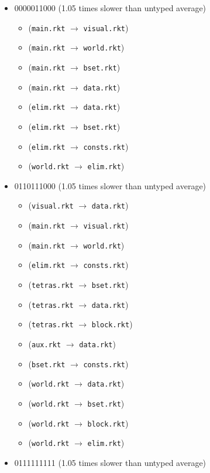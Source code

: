 \documentclass{article}
\newcommand{\mono}[1]{\texttt{#1}}
\begin{document}
\begin{itemize}
\item 0000011000 (1.05 times slower than untyped average)
  \begin{itemize}
  \item (\mono{main.rkt} $\rightarrow$ \mono{visual.rkt})
  \item (\mono{main.rkt} $\rightarrow$ \mono{world.rkt})
  \item (\mono{main.rkt} $\rightarrow$ \mono{bset.rkt})
  \item (\mono{main.rkt} $\rightarrow$ \mono{data.rkt})
  \item (\mono{elim.rkt} $\rightarrow$ \mono{data.rkt})
  \item (\mono{elim.rkt} $\rightarrow$ \mono{bset.rkt})
  \item (\mono{elim.rkt} $\rightarrow$ \mono{consts.rkt})
  \item (\mono{world.rkt} $\rightarrow$ \mono{elim.rkt})
  \end{itemize}
\item 0110111000 (1.05 times slower than untyped average)
  \begin{itemize}
  \item (\mono{visual.rkt} $\rightarrow$ \mono{data.rkt})
  \item (\mono{main.rkt} $\rightarrow$ \mono{visual.rkt})
  \item (\mono{main.rkt} $\rightarrow$ \mono{world.rkt})
  \item (\mono{elim.rkt} $\rightarrow$ \mono{consts.rkt})
  \item (\mono{tetras.rkt} $\rightarrow$ \mono{bset.rkt})
  \item (\mono{tetras.rkt} $\rightarrow$ \mono{data.rkt})
  \item (\mono{tetras.rkt} $\rightarrow$ \mono{block.rkt})
  \item (\mono{aux.rkt} $\rightarrow$ \mono{data.rkt})
  \item (\mono{bset.rkt} $\rightarrow$ \mono{consts.rkt})
  \item (\mono{world.rkt} $\rightarrow$ \mono{data.rkt})
  \item (\mono{world.rkt} $\rightarrow$ \mono{bset.rkt})
  \item (\mono{world.rkt} $\rightarrow$ \mono{block.rkt})
  \item (\mono{world.rkt} $\rightarrow$ \mono{elim.rkt})
  \end{itemize}
\item 0111111111 (1.05 times slower than untyped average)
  \begin{itemize}

\end{itemize}
\end{itemize}
\end{document}
